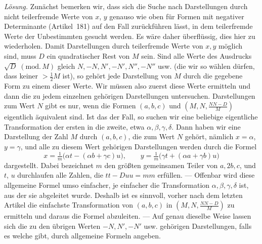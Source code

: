 \textit{Lösung.} Zunächst bemerken wir, dass sich die Suche nach Darstellungen durch nicht teilerfremde Werte von $x$, $y$ genauso wie oben für Formen mit negativer Determinante (Artikel~181) auf den Fall zurückführen lässt, in dem teilerfremde Werte der Unbestimmten gesucht werden. Es wäre daher überflüssig, dies hier zu wiederholen. Damit Darstellungen durch teilerfremde Werte von $x,y$ möglich sind, muss $D$ ein quadratischer Rest von $M$ sein. Sind alle Werte des Ausdrucks $\sqrt D\;(\mathrm{mod.}\,M)$ gleich $N,-N,N',-N',N'',-N''$ usw. (die wir so wählen dürfen, dass keiner $>\tfrac12M$ ist), so gehört jede Darstellung von $M$ durch die gegebene Form zu einem dieser Werte. Wir müssen also zuerst diese Werte ermitteln und dann die zu jedem einzelnen gehörigen Darstellungen untersuchen. Darstellungen zum Wert $N$ gibt es nur, wenn die Formen $(a,b,c)$ und $(M,N,\frac{NN-D}{M})$ eigentlich äquivalent sind. Ist das der Fall, so suchen wir eine beliebige eigentliche Transformation der ersten in die zweite, etwa $\alpha,\beta,\gamma,\delta$. Dann haben wir eine Darstellung der Zahl $M$ durch $(a,b,c)$, die zum Wert $N$ gehört, nämlich $x=\alpha$, $y=\gamma$, und alle zu diesem Wert gehörigen Darstellungen werden durch die Formel
\[
x=\tfrac1m\bigl(\alpha t-(\alpha b+\gamma c)u\bigr),\qquad
y=\tfrac1m\bigl(\gamma t+(\alpha a+\gamma b)u\bigr)
\]
dargestellt. Dabei bezeichnet $m$ den größten gemeinsamen Teiler von $a,2b,c$, und $t$, $u$ durchlaufen alle Zahlen, die $tt-Duu=mm$ erfüllen. --- Offenbar wird diese allgemeine Formel umso einfacher, je einfacher die Transformation $\alpha,\beta,\gamma,\delta$ ist, aus der sie abgeleitet wurde. Deshalb ist es sinnvoll, vorher nach dem letzten Artikel die einfachste Transformation von $(a,b,c)$ in $(M,N,\frac{NN-D}{M})$ zu ermitteln und daraus die Formel abzuleiten. --- Auf genau dieselbe Weise lassen sich die zu den übrigen Werten $-N,N',-N'$ usw. gehörigen Darstellungen, falls es welche gibt, durch allgemeine Formeln angeben.

